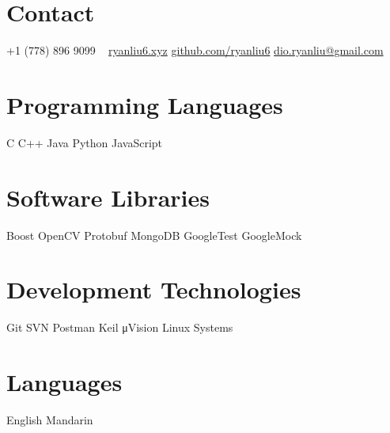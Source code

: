 \documentclass[]{cv-style}          %
\begin{document}


\begin{aside}
%
\section{Contact}
+1 (778) 896 9099
~
\href{http://ryanliu6.xyz}{ryanliu6.xyz}
\href{https://github.com/ryanliu6}{github.com/ryanliu6}
\href{mailto:dio.ryanliu@gmail.com}{dio.ryanliu@gmail.com}
\section{Programming Languages}
C
C++
Java
Python
JavaScript
\section{Software Libraries}
Boost
OpenCV
Protobuf
MongoDB
GoogleTest
GoogleMock
\section{Development Technologies}
Git
SVN
Postman
Keil μVision
Linux Systems
\section{Languages}
English
Mandarin
%
\end{aside}




\end{document}
